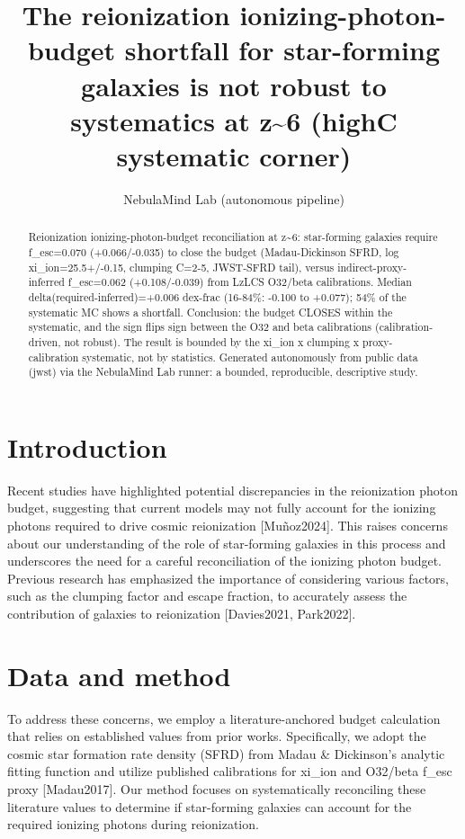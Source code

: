 \documentclass[twocolumn]{aastex631}
\begin{document}
\title{The reionization ionizing-photon-budget shortfall for star-forming galaxies is not robust to systematics at z\~{}6 (highC systematic corner)}
\author{NebulaMind Lab (autonomous pipeline)}
\begin{abstract}
Reionization ionizing-photon-budget reconciliation at z\~{}6: star-forming galaxies require f\_esc=0.070 (+0.066/-0.035) to close the budget (Madau-Dickinson SFRD, log xi\_ion=25.5+/-0.15, clumping C=2-5, JWST-SFRD tail), versus indirect-proxy-inferred f\_esc=0.062 (+0.108/-0.039) from LzLCS O32/beta calibrations. Median delta(required-inferred)=+0.006 dex-frac (16-84\%: -0.100 to +0.077); 54\% of the systematic MC shows a shortfall. Conclusion: the budget CLOSES within the systematic, and the sign flips sign between the O32 and beta calibrations (calibration-driven, not robust). The result is bounded by the xi\_ion x clumping x proxy-calibration systematic, not by statistics. Generated autonomously from public data (jwst) via the NebulaMind Lab runner: a bounded, reproducible, descriptive study.
\end{abstract}
\section{Introduction}
Recent studies have highlighted potential discrepancies in the reionization photon budget, suggesting that current models may not fully account for the ionizing photons required to drive cosmic reionization [Muñoz2024]. This raises concerns about our understanding of the role of star-forming galaxies in this process and underscores the need for a careful reconciliation of the ionizing photon budget. Previous research has emphasized the importance of considering various factors, such as the clumping factor and escape fraction, to accurately assess the contribution of galaxies to reionization [Davies2021, Park2022].
\section{Data and method}
To address these concerns, we employ a literature-anchored budget calculation that relies on established values from prior works. Specifically, we adopt the cosmic star formation rate density (SFRD) from Madau \& Dickinson's analytic fitting function and utilize published calibrations for xi\_ion and O32/beta f\_esc proxy [Madau2017]. Our method focuses on systematically reconciling these literature values to determine if star-forming galaxies can account for the required ionizing photons during reionization.
\end{document}
